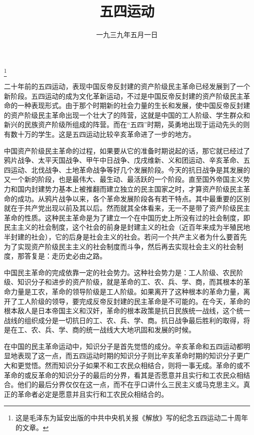 
\title{五四运动}
\date{一九三九年五月一日}
\thanks{这是毛泽东为延安出版的中共中央机关报《解放》写的纪念五四运动二十周年的文章。}
\maketitle


二十年前的五四运动，表现中国反帝反封建的资产阶级民主革命已经发展到了一个新阶段。五四运动的成为文化革新运动，不过是中国反帝反封建的资产阶级民主革命的一种表现形式。由于那个时期新的社会力量的生长和发展，使中国反帝反封建的资产阶级民主革命出现一个壮大了的阵营，这就是中国的工人阶级、学生群众和新兴的民族资产阶级所组成的阵营。而在“五四”时期，英勇地出现于运动先头的则有数十万的学生。这是五四运动比较辛亥革命进了一步的地方。

中国资产阶级民主革命的过程，如果要从它的准备时期说起的话，那它就已经过了鸦片战争、太平天国战争、甲午中日战争、戊戌维新、义和团运动、辛亥革命、五四运动、北伐战争、土地革命战争等好几个发展阶段。今天的抗日战争是其发展的又一个新的阶段，也是最伟大、最生动、最活跃的一个阶段。直至国外帝国主义势力和国内封建势力基本上被推翻而建立独立的民主国家之时，才算资产阶级民主革命的成功。从鸦片战争以来，各个革命发展阶段各有若干特点。其中最重要的区别就在于共产党出现以前及其以后。然而就其全体看来，无一不是带了资产阶级民主革命的性质。这种民主革命是为了建立一个在中国历史上所没有过的社会制度，即民主主义的社会制度，这个社会的前身是封建主义的社会（近百年来成为半殖民地半封建的社会），它的后身是社会主义的社会。若问一个共产主义者为什么要首先为了实现资产阶级民主主义的社会制度而斗争，然后再去实现社会主义的社会制度，那答复是：走历史必由之路。

中国民主革命的完成依靠一定的社会势力。这种社会势力是：工人阶级、农民阶级、知识分子和进步的资产阶级，就是革命的工、农、兵、学、商，而其根本的革命力量是工农，革命的领导阶级是工人阶级。如果离开了这种根本的革命力量，离开了工人阶级的领导，要完成反帝反封建的民主革命是不可能的。在今天，革命的根本敌人是日本帝国主义和汉奸，革命的根本政策是抗日民族统一战线，这个统一战线的组织成分是一切抗日的工、农、兵、学、商。抗日战争最后胜利的取得，将是在工、农、兵、学、商的统一战线大大地巩固和发展的时候。

在中国的民主革命运动中，知识分子是首先觉悟的成分。辛亥革命和五四运动都明显地表现了这一点，而五四运动时期的知识分子则比辛亥革命时期的知识分子更广大和更觉悟。然而知识分子如果不和工农民众相结合，则将一事无成。革命的或不革命的或反革命的知识分子的最后的分界，看其是否愿意并且实行和工农民众相结合。他们的最后分界仅仅在这一点，而不在乎口讲什么三民主义或马克思主义。真正的革命者必定是愿意并且实行和工农民众相结合的。

